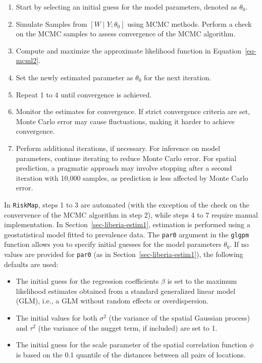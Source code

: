 \documentclass[
  letterpaper,
]{krantz}
\providecommand{\tightlist}{%
  \setlength{\itemsep}{0pt}\setlength{\parskip}{0pt}}\usepackage{longtable,booktabs,array}
\begin{document}
\begin{enumerate}
\def\labelenumi{\arabic{enumi}.}
\item
  Start by selecting an initial guess for the model parameters, denoted
  as \(\theta_0\).
\item
  Simulate Samples from \([W \mid Y; \theta_0]\) using MCMC methods.
  Perform a check on the MCMC samples to assess convergence of the MCMC
  algorithm.
\item
  Compute and maximize the approximate likelihood function in
  Equation~\ref{eq-mcml2}.
\item
  Set the newly estimated parameter as \(\theta_0\) for the next
  iteration.
\item
  Repeat 1 to 4 until convergence is achieved.
\item
  Monitor the estimates for convergence. If strict convergence criteria
  are set, Monte Carlo error may cause fluctuations, making it harder to
  achieve convergence.
\item
  Perform additional iterations, if necessary. For inference on model
  parameters, continue iterating to reduce Monte Carlo error. For
  spatial prediction, a pragmatic approach may involve stopping after a
  second iteration with 10,000 samples, as prediction is less affected
  by Monte Carlo error.
\end{enumerate}

In \texttt{RiskMap}, steps 1 to 3 are automated (with the exception of
the check on the convervence of the MCMC algorithm in step 2), while
steps 4 to 7 require manual implementation. In
Section~\ref{sec-liberia-estim1}, estimation is performed using a
geostatistical model fitted to prevalence data. The \texttt{par0}
argument in the \texttt{glgpm} function allows you to specify initial
guesses for the model parameters \(\theta_0\). If no values are provided
for \texttt{par0} (as in Section~\ref{sec-liberia-estim1}), the
following defaults are used:

\begin{itemize}
\tightlist
\item
  The initial guess for the regression coefficients \(\beta\) is set to
  the maximum likelihood estimates obtained from a standard generalized
  linear model (GLM), i.e., a GLM without random effects or
  overdispersion.
\item
  The initial values for both \(\sigma^2\) (the variance of the spatial
  Gaussian process) and \(\tau^2\) (the variance of the nugget term, if
  included) are set to 1.
\item
  The initial guess for the scale parameter of the spatial correlation
  function \(\phi\) is based on the 0.1 quantile of the distances
  between all pairs of locations.
\end{itemize}
\end{document}
